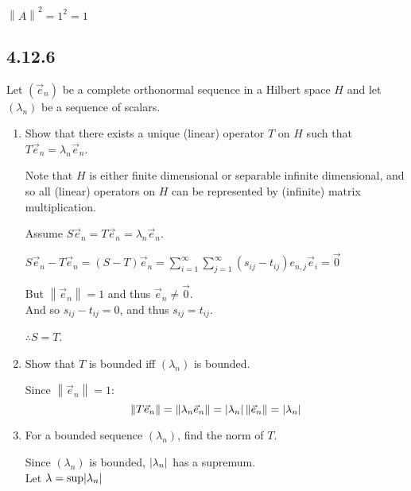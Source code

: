 \documentclass[letterpaper,12pt,fleqn]{article}
\newcommand{\ve}{\vec{e}}
\newcommand{\vo}{\vec{0}}
\newcommand{\norm}[1]{\left\|#1\right\|}
\renewcommand{\l}{\lambda}
\begin{document}
$\norm{A}^2=1^2=1$

\subsection*{4.12.6}

Let $(\ve_n)$ be a complete orthonormal sequence in a Hilbert space $H$ and let
$(\l_n)$ be a sequence of scalars.
\begin{enumerate}[label=(\alph*)]
\item Show that there exists a unique (linear) operator $T$ on $H$ such that
  $T\ve_n=\l_n\ve_n$.

  Note that $H$ is either finite dimensional or separable infinite dimensional,
  and so all (linear) operators on $H$ can be represented by (infinite) matrix
  multiplication.

  Assume $S\ve_n=T\ve_n=\l_n\ve_n$.

  $S\ve_n-T\ve_n=(S-T)\ve_n=
  \sum_{i=1}^{\infty}\sum_{j=1}^{\infty}(s_{ij}-t_{ij})e_{n,j}\ve_i=\vo$

  But $\norm{\ve_n}=1$ and thus $\ve_n\ne\vo$. \\
  And so $s_{ij}-t_{ij}=0$, and thus $s_{ij}=t_{ij}$.

  $\therefore S=T$.

\item Show that $T$ is bounded iff $(\l_n)$ is bounded.

  Since $\norm{\ve_n}=1$:
  \[\norm{T\ve_n}=\norm{\l_n\ve_n}=\abs{\l_n}\norm{\ve_n}=\abs{\l_n}\]

\item For a bounded sequence $(\l_n)$, find the norm of $T$.

  Since $(\l_n)$ is bounded, $\abs{\l_n}$ has a supremum. \\
  Let $\l=\sup\abs{\l_n}$
  

\end{enumerate}
\end{document}
